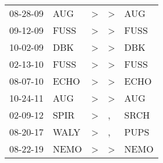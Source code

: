 \begin{supertabular}{lllll}
 08-28-09 &   AUG &  \textgreater &  \textgreater &   AUG \\
 09-12-09 &  FUSS &  \textgreater &  \textgreater &  FUSS \\
 10-02-09 &   DBK &  \textgreater &  \textgreater &   DBK \\
 02-13-10 &  FUSS &  \textgreater &  \textgreater &  FUSS \\
 08-07-10 &  ECHO &  \textgreater &  \textgreater &  ECHO \\
 10-24-11 &   AUG &  \textgreater &  \textgreater &   AUG \\
 02-09-12 &  SPIR &  \textgreater &             , &  SRCH \\
 08-20-17 &  WALY &  \textgreater &             , &  PUPS \\
 08-22-19 &  NEMO &  \textgreater &  \textgreater &  NEMO \\
\end{supertabular}
